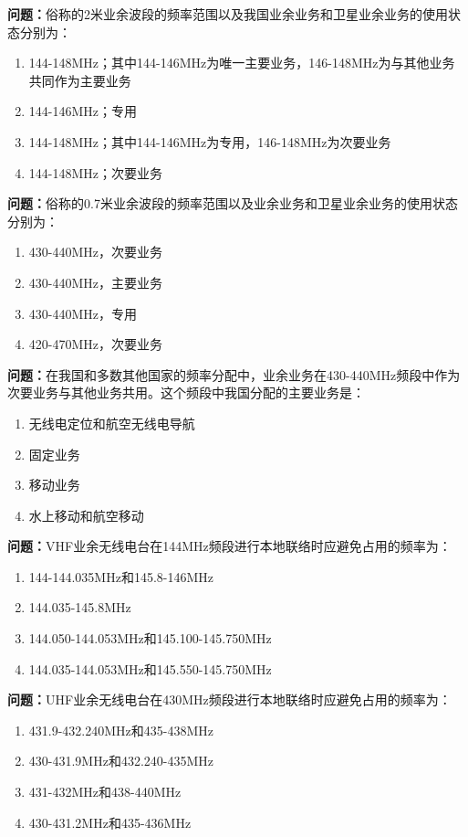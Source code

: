 \documentclass{ctexbook}
\begin{document}
\textbf{问题：}俗称的2米业余波段的频率范围以及我国业余业务和卫星业余业务的使用状态分别为：
\begin{enumerate}[label=\Alph*), leftmargin=3em]
\item 144-148MHz；其中144-146MHz为唯一主要业务，146-148MHz为与其他业务共同作为主要业务
\item 144-146MHz；专用
\item 144-148MHz；其中144-146MHz为专用，146-148MHz为次要业务
\item 144-148MHz；次要业务
\end{enumerate}

\textbf{问题：}俗称的0.7米业余波段的频率范围以及业余业务和卫星业余业务的使用状态分别为：
\begin{enumerate}[label=\Alph*), leftmargin=3em]
\item 430-440MHz，次要业务
\item 430-440MHz，主要业务
\item 430-440MHz，专用
\item 420-470MHz，次要业务
\end{enumerate}

\textbf{问题：}在我国和多数其他国家的频率分配中，业余业务在430-440MHz频段中作为次要业务与其他业务共用。这个频段中我国分配的主要业务是：
\begin{enumerate}[label=\Alph*), leftmargin=3em]
\item 无线电定位和航空无线电导航
\item 固定业务
\item 移动业务
\item 水上移动和航空移动
\end{enumerate}

\textbf{问题：}VHF业余无线电台在144MHz频段进行本地联络时应避免占用的频率为：
\begin{enumerate}[label=\Alph*), leftmargin=3em]
\item 144-144.035MHz和145.8-146MHz
\item 144.035-145.8MHz
\item 144.050-144.053MHz和145.100-145.750MHz
\item 144.035-144.053MHz和145.550-145.750MHz
\end{enumerate}

\textbf{问题：}UHF业余无线电台在430MHz频段进行本地联络时应避免占用的频率为：
\begin{enumerate}[label=\Alph*), leftmargin=3em]
\item 431.9-432.240MHz和435-438MHz
\item 430-431.9MHz和432.240-435MHz
\item 431-432MHz和438-440MHz
\item 430-431.2MHz和435-436MHz
\end{enumerate}
\end{document}
